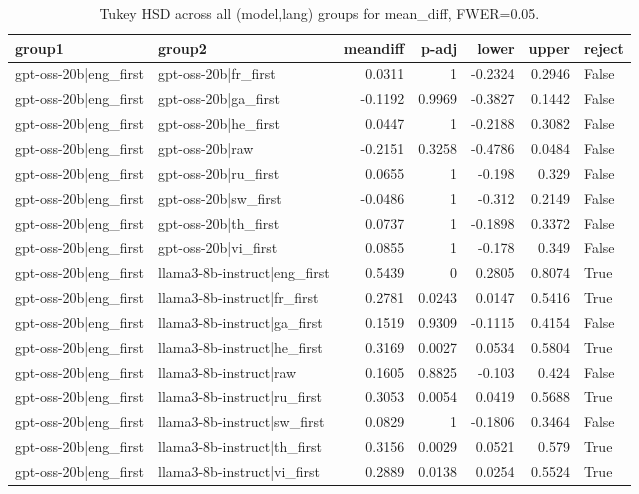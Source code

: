 \begin{table}
\caption{Tukey HSD across all (model,lang) groups for mean_diff, FWER=0.05.}
\label{tab:tukey_all_models_all_langs_mean_diff}
\begin{tabular}{l l r r r r l}
\toprule
group1 & group2 & meandiff & p-adj & lower & upper & reject \\
\midrule
gpt-oss-20b|eng_first & gpt-oss-20b|fr_first & 0.0311 & 1 & -0.2324 & 0.2946 & False \\
gpt-oss-20b|eng_first & gpt-oss-20b|ga_first & -0.1192 & 0.9969 & -0.3827 & 0.1442 & False \\
gpt-oss-20b|eng_first & gpt-oss-20b|he_first & 0.0447 & 1 & -0.2188 & 0.3082 & False \\
gpt-oss-20b|eng_first & gpt-oss-20b|raw & -0.2151 & 0.3258 & -0.4786 & 0.0484 & False \\
gpt-oss-20b|eng_first & gpt-oss-20b|ru_first & 0.0655 & 1 & -0.198 & 0.329 & False \\
gpt-oss-20b|eng_first & gpt-oss-20b|sw_first & -0.0486 & 1 & -0.312 & 0.2149 & False \\
gpt-oss-20b|eng_first & gpt-oss-20b|th_first & 0.0737 & 1 & -0.1898 & 0.3372 & False \\
gpt-oss-20b|eng_first & gpt-oss-20b|vi_first & 0.0855 & 1 & -0.178 & 0.349 & False \\
gpt-oss-20b|eng_first & llama3-8b-instruct|eng_first & 0.5439 & 0 & 0.2805 & 0.8074 & True \\
gpt-oss-20b|eng_first & llama3-8b-instruct|fr_first & 0.2781 & 0.0243 & 0.0147 & 0.5416 & True \\
gpt-oss-20b|eng_first & llama3-8b-instruct|ga_first & 0.1519 & 0.9309 & -0.1115 & 0.4154 & False \\
gpt-oss-20b|eng_first & llama3-8b-instruct|he_first & 0.3169 & 0.0027 & 0.0534 & 0.5804 & True \\
gpt-oss-20b|eng_first & llama3-8b-instruct|raw & 0.1605 & 0.8825 & -0.103 & 0.424 & False \\
gpt-oss-20b|eng_first & llama3-8b-instruct|ru_first & 0.3053 & 0.0054 & 0.0419 & 0.5688 & True \\
gpt-oss-20b|eng_first & llama3-8b-instruct|sw_first & 0.0829 & 1 & -0.1806 & 0.3464 & False \\
gpt-oss-20b|eng_first & llama3-8b-instruct|th_first & 0.3156 & 0.0029 & 0.0521 & 0.579 & True \\
gpt-oss-20b|eng_first & llama3-8b-instruct|vi_first & 0.2889 & 0.0138 & 0.0254 & 0.5524 & True \\

\end{tabular}
\end{table}
